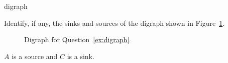 \begin{defproblem}{digraph}
  \begin{onlyproblem}\label{ex:digraph}
  Identify, if any, the sinks and sources of the digraph shown in Figure~\ref{fig:digraph}. 

  \begin{figure}[tbh]
    \centering
    \par
    \caption{Digraph for Question~\ref{ex:digraph}}
    \label{fig:digraph}
  \end{figure}
  \end{onlyproblem}
  \begin{onlysolution}
  $A$ is a source and $C$ is a sink.
  \end{onlysolution}
\end{defproblem}
